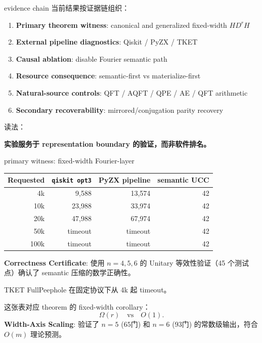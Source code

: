 \documentclass[aspectratio=169,11pt]{ctexbeamer}
\begin{document}
\begin{frame}{evidence chain}
  当前结果按证据链组织：

  \begin{enumerate}
    \item \textbf{Primary theorem witness}: canonical and generalized fixed-width $H D^r H$
    \item \textbf{External pipeline diagnostics}: Qiskit / PyZX / TKET
    \item \textbf{Causal ablation}: disable Fourier semantic path
    \item \textbf{Resource consequence}: semantic-first vs materialize-first
    \item \textbf{Natural-source controls}: QFT / AQFT / QPE / AE / QFT arithmetic
    \item \textbf{Secondary recoverability}: mirrored/conjugation parity recovery
  \end{enumerate}

  读法：
  \begin{center}
    \textbf{实验服务于 representation boundary 的验证，而非软件排名。}
  \end{center}
\end{frame}

\begin{frame}{primary witness: fixed-width Fourier-layer}
  \small
  \begin{tabular}{rrrr}
    \toprule
    Requested & \texttt{qiskit opt3} & PyZX pipeline & semantic UCC \\
    \midrule
    4k & 9{,}588 & 13{,}574 & 42 \\
    10k & 23{,}988 & 33{,}974 & 42 \\
    20k & 47{,}988 & 67{,}974 & 42 \\
    50k & timeout & timeout & 42 \\
    100k & timeout & timeout & 42 \\
    \bottomrule
  \end{tabular}

  \vspace{0.8em}
  \textbf{Correctness Certificate}: 使用 $n=4, 5, 6$ 的 Unitary 等效性验证（45 个测试点）确认了 semantic 压缩的数学正确性。

  \vspace{0.8em}
  TKET FullPeephole 在固定协议下从 4k 起 timeout。

  \vspace{0.8em}
  这张表对应 theorem 的 fixed-width corollary：
  \[
    \Omega(r)\quad\text{vs}\quad O(1).
  \]
  \textbf{Width-Axis Scaling}: 验证了 $n=5$ ($65$门) 和 $n=6$ ($93$门) 的常数级输出，符合 $O(m)$ 理论预测。
\end{frame}
\end{document}
